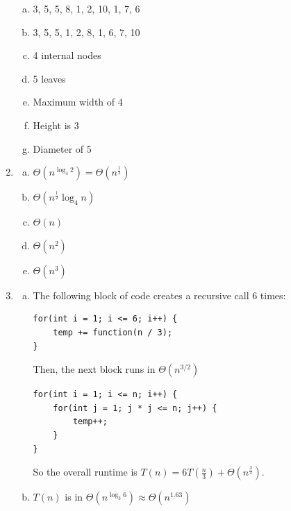 \documentclass[a4paper,10pt]{article}
\begin{document}
\begin{enumerate}
\begin{enumerate}[(a)]
	\item 3, 5, 5, 8, 1, 2, 10, 1, 7, 6
	
	\item 3, 5, 5, 1, 2, 8, 1, 6, 7, 10
	
	\item 4 internal nodes
	
	\item 5 leaves
	
	\item Maximum width of 4
	
	\item Height is 3
	
	\item Diameter of 5

\end{enumerate}

\item \begin{enumerate}[(a)]
	\item $\Theta(n^{\log_4{2}}) = \Theta (n^{\frac{1}{2}})$
	\item $\Theta(n^{\frac{1}{2}}\log_4{n})$
	\item $\Theta(n)$
	\item $\Theta(n^2)$
	\item $\Theta(n^3)$
\end{enumerate}

\item \begin{enumerate}[(a)]
	\item The following block of code creates a recursive call 6 times:
	\begin{lstlisting}
for(int i = 1; i <= 6; i++) {
    temp += function(n / 3);
}
	\end{lstlisting}
	Then, the next block runs in $\Theta(n^{3/2})$
	\begin{lstlisting}
for(int i = 1; i <= n; i++) {
	for(int j = 1; j * j <= n; j++) {
		temp++;
    }
}
	\end{lstlisting}
	
	So the overall runtime is $T(n) = 6T(\frac{n}{3}) + \Theta(n^{\frac{3}{2}})$.
	\item $T(n)$ is in $\Theta(n^{\log_3{6}}) \approx \Theta(n^{1.63})$

\end{enumerate}
\end{enumerate}
\end{document}
